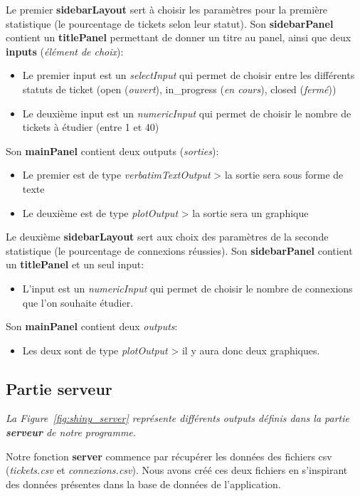 \documentclass[12pt, a4paper]{article}
\begin{document}
Le premier \textbf{sidebarLayout} sert à choisir les paramètres pour la première statistique (le pourcentage de tickets selon leur statut).
Son \textbf{sidebarPanel} contient un \textbf{titlePanel} permettant de donner un titre au panel, ainsi que deux \textbf{inputs} (\textit{élément de choix}):
\begin{itemize}
    \item Le premier input est un \textit{selectInput} qui permet de choisir entre les différents statuts de ticket
    (open (\textit{ouvert}), in\_progress (\textit{en cours}), closed (\textit{fermé}))
    \item Le deuxième input est un \textit{numericInput} qui permet de choisir le nombre de tickets à étudier (entre 1 et 40)
\end{itemize}
Son \textbf{mainPanel} contient deux outputs (\textit{sorties}):
\begin{itemize}
    \item Le premier est de type \textit{verbatimTextOutput} > la sortie sera sous forme de texte
    \item Le deuxième est de type \textit{plotOutput} > la sortie sera un graphique
\end{itemize}
\bigskip

Le deuxième \textbf{sidebarLayout} sert aux choix des paramètres de la seconde statistique (le pourcentage de connexions réussies).
Son \textbf{sidebarPanel} contient un \textbf{titlePanel} et un seul input:
\begin{itemize}
    \item L'input est un \textit{numericInput}  qui permet de choisir le nombre de connexions que l'on souhaite étudier.
\end{itemize}
Son \textbf{mainPanel} contient deux \textit{outputs}:
\begin{itemize}
    \item Les deux sont de type \textit{plotOutput} > il y aura donc deux graphiques.
\end{itemize}

\subsection*{Partie serveur}

\noindent \textit{La Figure~\ref{fig:shiny_server} représente différents outputs définis dans la partie \textbf{serveur} de notre programme.}
\bigskip

Notre fonction \textbf{server} commence par récupérer les données des fichiers csv (\textit{tickets.csv} et \textit{connexions.csv}).
Nous avons créé ces deux fichiers en s'inspirant des données présentes dans la base de données de l'application.
\end{document}
